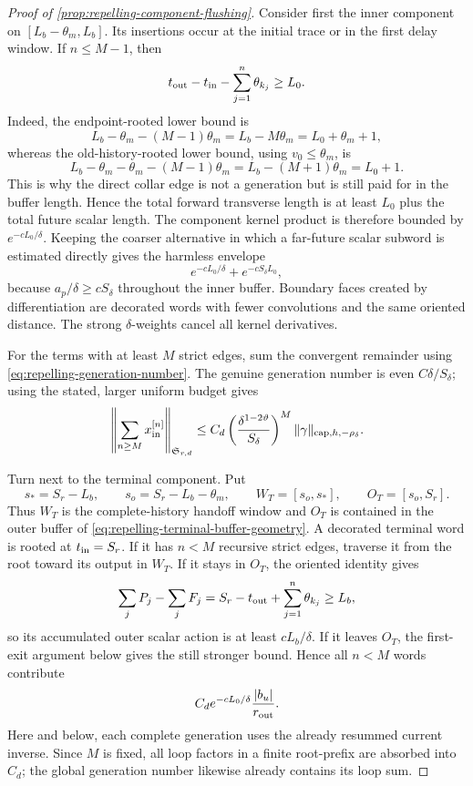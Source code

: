\begin{proof}[Proof of
\cref{prop:repelling-component-flushing}]
Consider first the inner component on
\([L_b-\theta_m,L_b]\).  Its insertions occur at the initial trace or in
the first delay window.  If \(n\le M-1\), then
\begin{equation}
 t_{\rm out}-t_{\rm in}
       -\sum_{j=1}^n\theta_{k_j}\ge L_0.           \label{eq:repelling-inner-word-distance}
\end{equation}
Indeed, the endpoint-rooted lower bound is
\[
 L_b-\theta_m-(M-1)\theta_m
   =L_b-M\theta_m=L_0+\theta_m+1,
\]
whereas the old-history-rooted lower bound, using
\(v_0\le\theta_m\), is
\[
 L_b-\theta_m-\theta_m-(M-1)\theta_m
   =L_b-(M+1)\theta_m=L_0+1.
\]
This is why the direct collar edge is not a generation but is still paid
for in the buffer length.
Hence the total forward transverse length is at least \(L_0\) plus the
total future scalar length.  The component kernel product is therefore
bounded by \(e^{-cL_0/\delta}\).  Keeping the coarser alternative in which
a far-future scalar subword is estimated directly gives the harmless
envelope
\begin{equation}
 e^{-cL_0/\delta}+e^{-cS_\delta L_0},              \label{eq:repelling-inner-low-word-tail}
\end{equation}
because \(a_p/\delta\ge cS_\delta\) throughout the inner buffer.  Boundary
faces created by differentiation are decorated words with fewer
convolutions and the same oriented distance.  The strong \(\delta\)-weights
cancel all kernel derivatives.

For the terms with at least \(M\) strict edges, sum the convergent remainder
using \cref{eq:repelling-generation-number}.  The genuine generation number
is even \(C\delta/S_\delta\); using the stated, larger uniform budget gives
\begin{equation}
 \left\|\sum_{n\ge M}x_{\rm in}^{[n]}\right\|_{\mathfrak S_{r,d}}
 \le C_d\left(\frac{\delta^{1-2\vartheta}}{S_\delta}\right)^M
       \|\gamma\|_{\mathrm{cap},h,-\rho_\delta}.  \label{eq:repelling-inner-generation-tail}
\end{equation}

Turn next to the terminal component.  Put
\[
 s_*=S_r-L_b,\qquad s_o=S_r-L_b-\theta_m,\qquad
 W_T=[s_o,s_*],\qquad O_T=[s_o,S_r].
\]
Thus \(W_T\) is the complete-history handoff window and \(O_T\) is contained
in the outer buffer of
\cref{eq:repelling-terminal-buffer-geometry}.  A decorated terminal word is
rooted at \(t_{\rm in}=S_r\).  If it has \(n<M\) recursive strict edges,
traverse it from the root toward its output in \(W_T\).  If it stays in
\(O_T\), the oriented identity gives
\[
 \sum_jP_j-\sum_jF_j
 =S_r-t_{\rm out}+\sum_{j=1}^n\theta_{k_j}\ge L_b,
\]
so its accumulated outer scalar action is at least \(cL_b/\delta\).  If it
leaves \(O_T\), the first-exit argument below gives the still stronger
bound.  Hence all \(n<M\) words contribute
\[
 C_de^{-cL_0/\delta}
       \frac{|b_u|}{r_{\rm out}}.
\]
Here and below, each complete generation uses the already resummed current
inverse.  Since \(M\) is fixed, all loop factors in a finite root-prefix are
absorbed into \(C_d\); the global generation number likewise already
contains its loop sum.


\end{proof}
